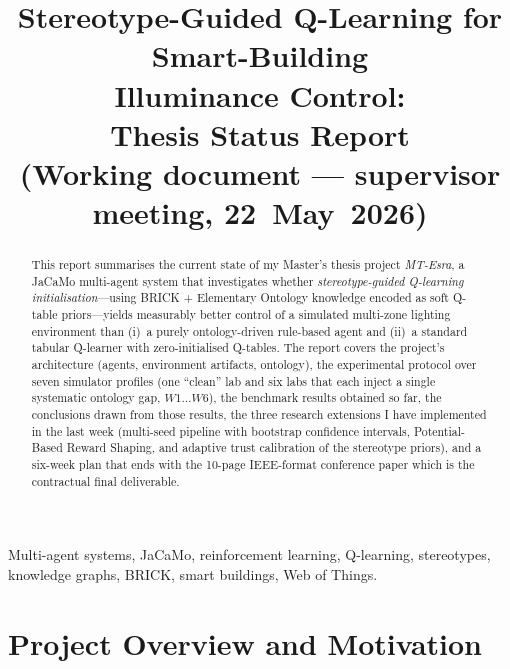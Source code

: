 \documentclass[conference]{IEEEtran}
\begin{document}
\title{Stereotype-Guided Q-Learning for Smart-Building \\Illuminance Control: \\Thesis Status Report
\\ \large (Working document --- supervisor meeting, 22~May~2026)}

\author{
}

\maketitle

\begin{abstract}
This report summarises the current state of my Master's thesis project
\emph{MT-Esra}, a JaCaMo multi-agent system that investigates whether
\emph{stereotype-guided Q-learning initialisation}---using BRICK + Elementary
Ontology knowledge encoded as soft Q-table priors---yields measurably better
control of a simulated multi-zone lighting environment than (i)~a purely
ontology-driven rule-based agent and (ii)~a standard tabular Q-learner with
zero-initialised Q-tables. The report covers the project's architecture
(agents, environment artifacts, ontology), the experimental protocol over
seven simulator profiles (one ``clean'' lab and six labs that each inject a
single systematic ontology gap, $W1\ldots W6$), the benchmark results
obtained so far, the conclusions drawn from those results, the three research
extensions I have implemented in the last week
(multi-seed pipeline with bootstrap confidence intervals,
Potential-Based Reward Shaping, and adaptive trust calibration of the
stereotype priors), and a six-week plan that ends with the 10-page
IEEE-format conference paper which is the contractual final deliverable.
\end{abstract}

\begin{IEEEkeywords}
Multi-agent systems, JaCaMo, reinforcement learning, Q-learning,
stereotypes, knowledge graphs, BRICK, smart buildings, Web of Things.
\end{IEEEkeywords}

\section{Project Overview and Motivation}
\label{sec:overview}
\end{document}
